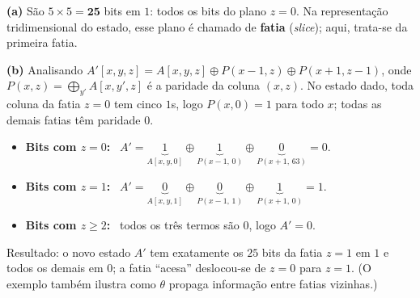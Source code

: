 \documentclass[11pt,a4paper]{article}
\newenvironment{resposta}{%
    \begin{respostabox}
    \color{red!70!black}\sloppy
}{%
    \end{respostabox}
}
\begin{document}
\begin{resposta}
\textbf{(a)} S\~{a}o $5 \times 5 = \mathbf{25}$ bits em $1$: todos os bits do plano $z = 0$. Na representa\c{c}\~{a}o tridimensional do estado, esse plano \'{e} chamado de \textbf{fatia} (\textit{slice}); aqui, trata-se da primeira fatia.

\textbf{(b)} Analisando $A'[x,y,z] = A[x,y,z] \oplus P(x{-}1, z) \oplus P(x{+}1, z{-}1)$, onde $P(x,z) = \bigoplus_{y'} A[x,y',z]$ \'{e} a paridade da coluna $(x,z)$. No estado dado, toda coluna da fatia $z=0$ tem cinco $1$s, logo $P(x, 0) = 1$ para todo $x$; todas as demais fatias t\^{e}m paridade $0$.
\begin{itemize}
    \item \textbf{Bits com $z = 0$:} \ $A' = \underbrace{1}_{A[x,y,0]} \oplus \underbrace{1}_{P(x-1,\,0)} \oplus \underbrace{0}_{P(x+1,\,63)} = 0$.
    \item \textbf{Bits com $z = 1$:} \ $A' = \underbrace{0}_{A[x,y,1]} \oplus \underbrace{0}_{P(x-1,\,1)} \oplus \underbrace{1}_{P(x+1,\,0)} = 1$.
    \item \textbf{Bits com $z \ge 2$:} \ todos os tr\^{e}s termos s\~{a}o $0$, logo $A' = 0$.
\end{itemize}
Resultado: o novo estado $A'$ tem exatamente os $25$ bits da fatia $z = 1$ em $1$ e todos os demais em $0$; a fatia ``acesa'' deslocou-se de $z=0$ para $z=1$. (O exemplo tamb\'{e}m ilustra como $\theta$ propaga informa\c{c}\~{a}o entre fatias vizinhas.)
\end{resposta}
\end{document}
